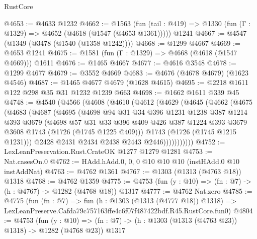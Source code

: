 \begin{lexlean}{RustCore}
\begin{coremodule}
@4653 := @4633 @1232
@4662 := @1563
    (fun (tail : @419) => @1330 (fun (Γ : @1329) => @4652 (@4618 (@1547 (@4653 @1361)))))
    @1241
@4667 := @4547 (@1349 (@3478 (@1540 (@1358 @1242))))
@4668 := @1299 @4667
@4669 := @4653 @1241
@4675 := @1581 (fun (Γ : @1329) => @4668 (@4618 (@1547 @4669))) @1611
@4676 := @1465 @4667
@4677 := @4616 @3548
@4678 := @1299 @4677
@4679 := @3552 @4669
@4683 := @4676 (@4678 @4679) (@1623 @4546)
@4687 := @1465 @4677 @4679 (@1628 @4615)
@4695 := @2218 @1611 @122 @298 @35 @31 @1232 @1239 @663
@4698 := @1662 @1611 @339 @45
@4748 := @4540
    (@4566
      (@4608
        (@4610
          (@4612
            (@4629
              (@4645
                (@4662
                  (@4675
                    (@4683
                      (@4687
                        (@4695
                          (@4698
                            @94
                            @31
                            @34
                            @396
                            @1231
                            @1238
                            @387
                            @1214
                            @393
                            @3679
                            (@4698
                              @57
                              @31
                              @33
                              @396
                              @409
                              @426
                              @387
                              @1224
                              @393
                              @3679
                              @3608
                              @1743
                              (@1726 (@1745 @1225 @409)))
                            @1743
                            (@1726 (@1745 @1215 @1231)))
                          @2428
                          @2431
                          @2434
                          @2438
                          @2443
                          @2446)))))))))))
@4752 := LexLeanPreservation.Rust.CrateOK @1277 @1279 @1281
@4753 := Nat.casesOn.{0}
@4762 := HAdd.hAdd.{0, 0, 0} @10 @10 @10 (instHAdd.{0} @10 instAddNat)
@4763 := @4762 @1361
@4767 := @1303 (@1313 (@4763 @18)) @1318
@4768 := @4762 @1359
@4775 := @4753 (fun (y : @10) => (fn : @7) -> (h : @4767) -> @1282 (@4768 @18)) @1317
@4777 := @4762 Nat.zero
@4785 := @4775
    (fun (fn : @7) =>
    fun (h : @1303 (@1313 (@4777 @18)) @1318) =>
    LexLeanPreserve.Cafda79c757163ffe4c6f07f487422bdf.R45.RustCore.fun0)
@4804 := @4753
    (fun (y : @10) => (fn : @7) -> (h : @1303 (@1313 (@4763 @23)) @1318) -> @1282 (@4768 @23))
    @1317

\end{coremodule}
\end{lexlean}
